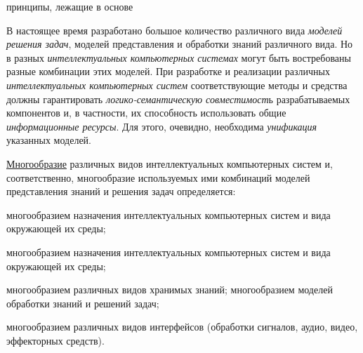 \begin{SCn}
	\begin{scnrelfromlistcustom}{принципы, лежащие в основе}
	
	\end{scnrelfromlistcustom}
\end{SCn}

В настоящее время разработано большое количество различного вида \textit{моделей решения задач}, моделей представления и обработки знаний различного вида. Но в разных \textit{интеллектуальных компьютерных системах} могут быть востребованы разные комбинации этих моделей. При разработке и реализации различных \textit{интеллектуальных компьютерных систем} соответствующие методы и средства должны гарантировать \textit{логико-семантическую совместимост}ь разрабатываемых компонентов и, в частности, их способность использовать общие \textit{информационные ресурсы}. Для этого, очевидно, необходима \textit{унификация} указанных моделей.

\underline{Многообразие} различных видов интеллектуальных компьютерных систем и, соответственно, многообразие используемых ими комбинаций моделей представления знаний и решения задач определяется:
\begin{textitemize}
	\item многообразием назначения интеллектуальных компьютерных систем и вида окружающей их среды;
	\item многообразием назначения интеллектуальных компьютерных систем и вида окружающей их среды;
	\item многообразием различных видов хранимых знаний; многообразием моделей обработки знаний и решений задач;
	\item многообразием различных видов интерфейсов (обработки сигналов, аудио, видео, эффекторных средств).
\end{textitemize}

